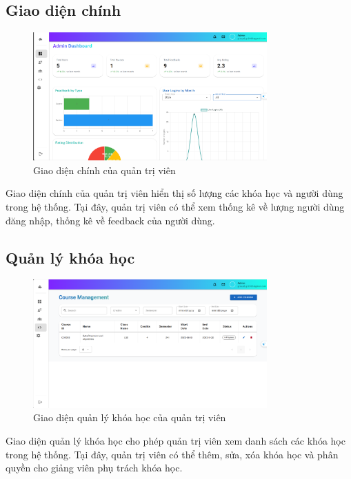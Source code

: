 \subsection{Giao diện chính}
\begin{figure}[H]
    \centering
    \includegraphics[width=0.8\textwidth]{images/CapScreen_Admin/dashboard.png}
    \caption{Giao diện chính của quản trị viên}
    \label{fig:admin_home_page}
\end{figure}
Giao diện chính của quản trị viên hiển thị số lượng các khóa học và người dùng trong hệ thống. Tại đây, quản trị viên có thể xem thống kê về lượng người dùng đăng nhập, thống kê về feedback của người dùng.
\subsection{Quản lý khóa học}
\begin{figure}[H]
    \centering
    \includegraphics[width=0.8\textwidth]{images/CapScreen_Admin/course.png}
    \caption{Giao diện quản lý khóa học của quản trị viên}
    \label{fig:admin_course_page}
\end{figure}
Giao diện quản lý khóa học cho phép quản trị viên xem danh sách các khóa học trong hệ thống. Tại đây, quản trị viên có thể thêm, sửa, xóa khóa học và phân quyền cho giảng viên phụ trách khóa học.
